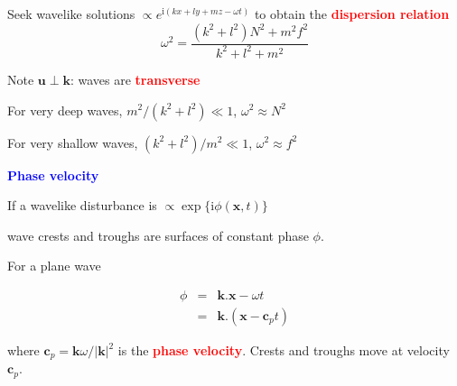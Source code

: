 \documentclass[a4]{seminar}
\newcommand{\ii}{\mathrm{i}}
\newcommand{\R}[1]{\textcolor{red}{#1}}
\newcommand{\B}[1]{\textcolor{blue}{#1}}
\begin{document}

\begin{slide}

Seek wavelike solutions \( \propto e^{\ii (kx+ly+mz - \omega t)} \)
to obtain the \R{\bf dispersion relation}
\begin{displaymath}
\omega^2 = \frac{(k^2 + l^2) N^2 + m^2 f^2}{k^2 + l^2 + m^2}
\end{displaymath}

\vspace{3mm}

Note \( \mathbf{u} \perp \mathbf{k} \): waves are \R{\bf transverse}

\vspace{3mm}

For very deep waves, \( m^2 / (k^2 + l^2) \ll 1\), \( \omega^2 \approx N^2 \)

\vspace{3mm}

For very shallow waves, \( (k^2 + l^2) / m^2 \ll 1\), \( \omega^2 \approx f^2 \)




\end{slide}


\begin{slide}

\B{\bf Phase velocity}

If a wavelike disturbance is \( \propto \exp \{\ii \phi(\mathbf{x},t) \} \)

wave crests and troughs are surfaces of constant phase \( \phi \).

For a plane wave

\begin{eqnarray}
\phi & = & \mathbf{k}.\mathbf{x} - \omega t \nonumber \\
     & = & \mathbf{k}.(\mathbf{x} - \mathbf{c}_p t) \nonumber
\end{eqnarray}

where \( \mathbf{c}_p = \mathbf{k} \omega / |\mathbf{k}|^2 \)
is the \R{\bf phase velocity}. Crests and troughs move at velocity
\( \mathbf{c}_p \).

\end{slide}

\end{document}

